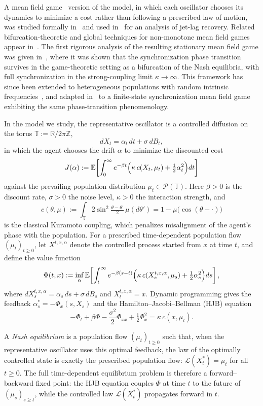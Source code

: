 \documentclass{amsart}
\newcommand{\T}{\mathbb T}
\begin{document}
A mean field game~\cite{LL,HMC,CarmonaDelarue} version of the model,
in which each oscillator chooses its dynamics to minimize a cost
rather than following a prescribed law of motion, was studied
formally in~\cite{YMMS} and used in~\cite{CG} for an analysis of
jet-lag recovery. Related bifurcation-theoretic and global techniques for
non-monotone mean field games appear in~\cite{Cirant}. The first
rigorous analysis of the resulting stationary mean field game was
given in~\cite{CCS}, where it was shown that the
synchronization phase transition survives in the game-theoretic
setting as a bifurcation of the Nash equilibria, with full
synchronization in the strong-coupling limit $\kappa\to\infty$. This
framework has since been extended to heterogeneous populations with
random intrinsic frequencies~\cite{CCS2}, and adapted in~\cite{HS} to
a finite-state synchronization mean field game exhibiting the same
phase-transition phenomenology.

In the model we study, the representative oscillator is a controlled
diffusion on the torus $\T:=\mathbb R/2\pi\mathbb Z$,
\[
dX_t=\alpha_t\,dt+\sigma\,dB_t,
\]
in which the agent chooses the drift $\alpha$ to minimize the
discounted cost
\[
J(\alpha):=\mathbb E\!\left[\int_0^\infty e^{-\beta t}
\Bigl(\kappa\,c(X_t,\mu_t)+\tfrac12\alpha_t^2\Bigr)dt\right]
\]
against the prevailing population distribution
$\mu_t\in\mathcal P(\T)$. Here $\beta>0$ is the discount rate,
$\sigma>0$ the noise level, $\kappa>0$ the interaction strength, and
\[
c(\theta,\mu):=\int_\T 2\sin^2\!\tfrac{\theta-\theta'}{2}\,\mu(d\theta')
=1-\mu\bigl(\cos(\theta-\cdot)\bigr)
\]
is the classical Kuramoto coupling, which penalizes misalignment of the
agent's phase with the population. For a prescribed time-dependent
population flow $(\mu_t)_{t\geq 0}$, let $X^{t,x,\alpha}$ denote the
controlled process started from $x$ at time $t$, and define the value
function
\[
\Phi(t,x):=\inf_\alpha\mathbb E\!\left[\int_t^\infty e^{-\beta(s-t)}
\Bigl(\kappa\,c(X_s^{t,x,\alpha},\mu_s)
+\tfrac12\alpha_s^2\Bigr)ds\right],
\]
where $dX_s^{t,x,\alpha}=\alpha_s\,ds+\sigma\,dB_s$ and
$X_t^{t,x,\alpha}=x$. Dynamic programming gives the feedback
$\alpha_s^*=-\Phi_x(s,X_s)$ and the Hamilton--Jacobi--Bellman (HJB) equation
\[
-\Phi_t+\beta\Phi-\frac{\sigma^2}{2}\Phi_{xx}
+\tfrac12\Phi_x^2=\kappa\,c(x,\mu_t).
\]

A \emph{Nash equilibrium} is a population flow $(\mu_t)_{t\geq 0}$ such
that, when the representative oscillator uses this optimal feedback,
the law of the optimally controlled state is exactly the prescribed
population flow: $\mathcal L(X_t^*)=\mu_t$ for all $t\geq 0$. The full
time-dependent equilibrium problem is therefore a forward--backward
fixed point: the HJB equation couples $\Phi$ at time $t$ to the future
of $(\mu_s)_{s\geq t}$, while the controlled law
$\mathcal L(X_t^*)$ propagates forward in $t$.
\end{document}
